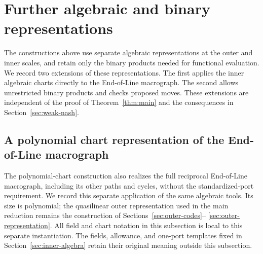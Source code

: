 \section{Further algebraic and binary representations}
\label{sec:extensions}

The constructions above use separate algebraic representations at the
outer and inner scales, and retain only the binary products needed for
functional evaluation. We record two extensions of these representations.
The first applies the inner algebraic charts directly to the End-of-Line
macrograph. The second allows unrestricted binary products and checks
proposed moves. These extensions are independent of the proof of
Theorem~\ref{thm:main} and the consequences in Section~\ref{sec:weak-nash}.

\subsection{A polynomial chart representation of the End-of-Line macrograph}
\label{ia:eol-variant}

The polynomial-chart construction also realizes the full reciprocal
End-of-Line macrograph, including its other paths and cycles, without
the standardized-port requirement. We record this separate application
of the same algebraic tools. Its size
is polynomial; the quasilinear outer representation used in the main
reduction remains the construction of Sections~\ref{sec:outer-codes}--
\ref{sec:outer-representation}.
All field and chart notation in this subsection is local to this separate
instantiation. The fields, allowance, and one-port templates fixed in
Section~\ref{sec:inner-algebra} retain their original meaning outside
this subsection.


